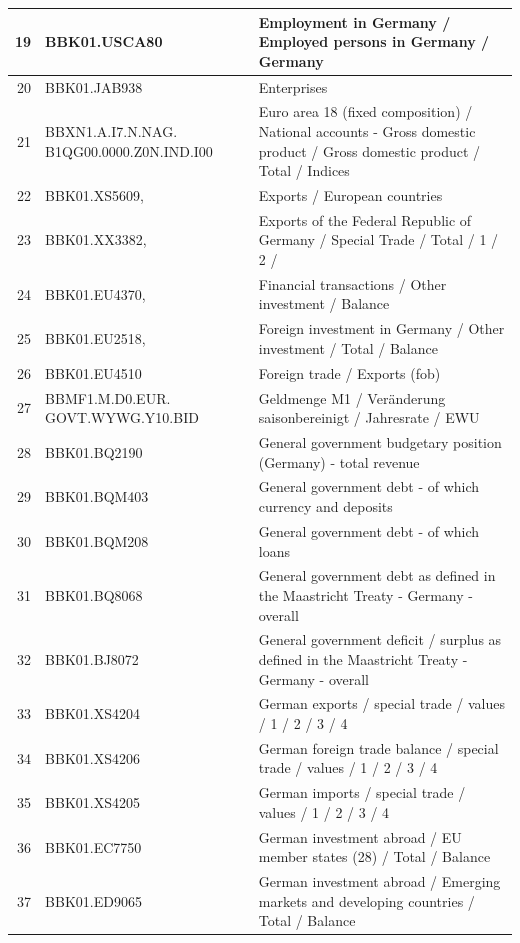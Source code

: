 \documentclass[12pt]{article}
\begin{document}
\begin{table}
\begin{tabular}{rp{5cm}p{11cm}}
  19 & BBK01.USCA80 & Employment in Germany / Employed persons in Germany / Germany \\ 
  \hline
  20 & BBK01.JAB938 & Enterprises \\ 
  \hline
  21 & BBXN1.A.I7.N.NAG. B1QG00.0000.Z0N.IND.I00 & Euro area 18 (fixed composition) / National accounts - Gross domestic product / Gross domestic product / Total / Indices \\ 
  \hline
  22 & BBK01.XS5609, & Exports / European countries \\ 
  \hline
  23 & BBK01.XX3382, & Exports of the Federal Republic of Germany / Special Trade / Total / 1 / 2 / \\ 
  \hline
  24 & BBK01.EU4370, & Financial transactions / Other investment / Balance \\ 
  \hline
  25 & BBK01.EU2518, & Foreign investment in Germany / Other investment / Total / Balance \\ 
  26 & BBK01.EU4510 & Foreign trade / Exports (fob) \\ 
  \hline
  27 & BBMF1.M.D0.EUR. GOVT.WYWG.Y10.BID & Geldmenge M1 /                                                   Veränderung saisonbereinigt / Jahresrate / EWU \\ 
  \hline
  28 & BBK01.BQ2190 & General government budgetary position (Germany) - total revenue \\ 
  \hline
  29 & BBK01.BQM403 & General government debt - of which currency and deposits \\ 
  30 & BBK01.BQM208 & General government debt - of which loans \\ 
  \hline
  31 & BBK01.BQ8068 & General government debt as defined in the Maastricht Treaty - Germany - overall \\ 
  \hline
  32 & BBK01.BJ8072 & General government deficit / surplus as defined in the Maastricht Treaty - Germany - overall \\ 
  \hline
  33 & BBK01.XS4204 & German exports / special trade / values / 1 / 2 / 3 / 4 \\ 
  \hline
  34 & BBK01.XS4206 & German foreign trade balance / special trade / values / 1 / 2 / 3 / 4 \\ 
  \hline
  35 & BBK01.XS4205 & German imports / special trade / values / 1 / 2 / 3 / 4 \\ 
  \hline
  36 & BBK01.EC7750 & German investment abroad / EU member states (28) / Total / Balance \\ 
  \hline
  37 & BBK01.ED9065 & German investment abroad / Emerging markets and developing countries / Total / Balance \\ 

\end{tabular}
\end{table}
\end{document}
